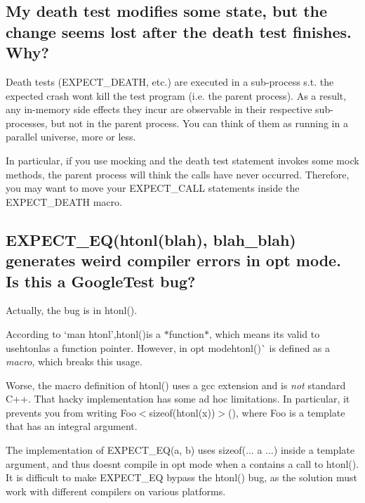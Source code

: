 \subsection*{My death test modifies some state, but the change seems lost after the death test finishes. Why?}

Death tests ({\ttfamily E\+X\+P\+E\+C\+T\+\_\+\+D\+E\+A\+TH}, etc.) are executed in a sub-\/process s.\+t. the expected crash won\textquotesingle{}t kill the test program (i.\+e. the parent process). As a result, any in-\/memory side effects they incur are observable in their respective sub-\/processes, but not in the parent process. You can think of them as running in a parallel universe, more or less.

In particular, if you use mocking and the death test statement invokes some mock methods, the parent process will think the calls have never occurred. Therefore, you may want to move your {\ttfamily E\+X\+P\+E\+C\+T\+\_\+\+C\+A\+LL} statements inside the {\ttfamily E\+X\+P\+E\+C\+T\+\_\+\+D\+E\+A\+TH} macro.

\subsection*{E\+X\+P\+E\+C\+T\+\_\+\+E\+Q(htonl(blah), blah\+\_\+blah) generates weird compiler errors in opt mode. Is this a Google\+Test bug?}

Actually, the bug is in {\ttfamily htonl()}.

According to `\textquotesingle{}man htonl'{\ttfamily ,}htonl(){\ttfamily is a $\ast$function$\ast$, which means it\textquotesingle{}s valid to use}htonl{\ttfamily as a function pointer. However, in opt mode}htonl()\`{} is defined as a {\itshape macro}, which breaks this usage.

Worse, the macro definition of {\ttfamily htonl()} uses a {\ttfamily gcc} extension and is {\itshape not} standard C++. That hacky implementation has some ad hoc limitations. In particular, it prevents you from writing {\ttfamily Foo$<$sizeof(htonl(x))$>$()}, where {\ttfamily Foo} is a template that has an integral argument.

The implementation of {\ttfamily E\+X\+P\+E\+C\+T\+\_\+\+E\+Q(a, b)} uses {\ttfamily sizeof(... a ...)} inside a template argument, and thus doesn\textquotesingle{}t compile in opt mode when {\ttfamily a} contains a call to {\ttfamily htonl()}. It is difficult to make {\ttfamily E\+X\+P\+E\+C\+T\+\_\+\+EQ} bypass the {\ttfamily htonl()} bug, as the solution must work with different compilers on various platforms.

